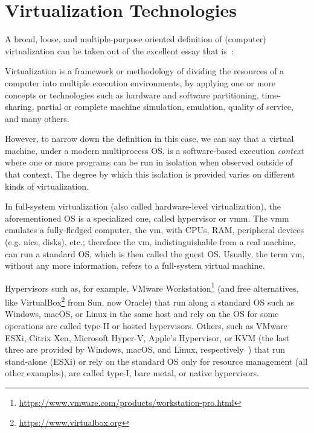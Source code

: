 \section{Virtualization Technologies}
\label{sec:leavingvirtualization}

A broad, loose, and multiple-purpose oriented definition of (computer) virtualization can be taken out of the excellent essay that is~\cite{introvirtualization}:
\begin{displayquote}
Virtualization is a framework or methodology of dividing the resources of a computer into multiple execution environments, by applying one or more concepts or technologies such as hardware and software partitioning, time-sharing, partial or complete machine simulation, emulation, quality of service, and many others.
\end{displayquote}

However, to narrow down the definition in this case, we can say that a virtual machine, under  a modern multiprocess OS, is a software-based execution \emph{context} where one or more programs can be run in isolation when observed outside of that context.
The degree by which this isolation is provided varies on different kinds of virtualization.

In full-system virtualization (also called hardware-level virtualization), the aforementioned OS is a specialized one, called hypervisor or \gls{vmm}.
The \gls{vmm} emulates a fully-fledged computer, the \gls{vm}, with CPUs, RAM, peripheral devices (e.g. \glspl{nic}, disks), etc.; therefore the \gls{vm}, indistinguishable from a real machine, can run a standard OS, which is then called the guest OS.
Usually, the term \gls{vm}, without any more information, refers to a full-system virtual machine.

Hypervisors such as, for example, VMware Workstation\footnote{\url{https://www.vmware.com/products/workstation-pro.html}} (and free alternatives, like VirtualBox\footnote{\url{https://www.virtualbox.org}} from Sun, now Oracle) that run along a standard OS such as Windows, macOS, or Linux in the same host and rely on the OS for some operations are called type-II or hosted hypervisors.
Others, such as VMware ESXi, Citrix Xen, Microsoft Hyper-V, Apple's Hypervisor, or KVM (the last three are provided by Windows, macOS, and Linux, respectively~\cite{whatiskvm,applehypervisor,hyperv}) that run stand-alone (ESXi) or rely on the standard OS only for resource management (all other examples), are called type-I, bare metal, or native hypervisors.

